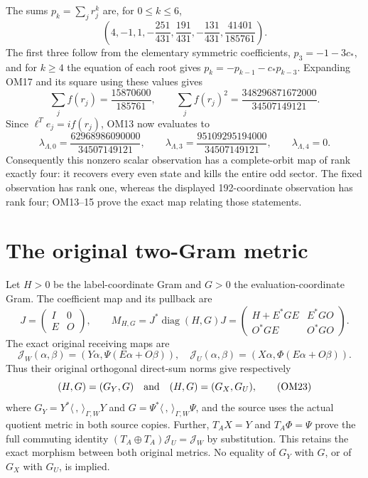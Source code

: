 \documentclass[11pt]{article}
\newcommand{\diag}{\operatorname{diag}}
\begin{document}
The sums $p_k=\sum_jr_j^k$ are, for $0\le k\le6$,
\[
\left(4,-1,1,-\frac{251}{431},\frac{191}{431},
             -\frac{131}{431},\frac{41401}{185761}\right).
\tag{OM18}
\]
The first three follow from the elementary symmetric coefficients,
$p_3=-1-3c_*$, and for $k\ge4$ the equation of each root gives
$p_k=-p_{k-1}-c_*p_{k-3}$.  Expanding OM17 and its square using
these values gives
\[
\sum_jf(r_j)=\frac{15870600}{185761},\qquad
\sum_jf(r_j)^2=\frac{348296871672000}{34507149121}.
\tag{OM19}
\]
Since $\ell^Te_j=if(r_j)$, OM13 now evaluates to
\[
\lambda_{\Lambda,0}=\frac{62968986090000}{34507149121},
\qquad
\lambda_{\Lambda,3}=\frac{95109295194000}{34507149121},
\qquad
\lambda_{\Lambda,4}=0.
\tag{OM20}
\]
Consequently this nonzero scalar observation has a complete-orbit
map of rank exactly four: it recovers every even state and kills
the entire odd sector.  The fixed observation has rank one, whereas
the displayed 192-coordinate observation has rank four; OM13--15
prove the exact map relating those statements.

\section{The original two-Gram metric}
Let $H>0$ be the label-coordinate Gram and $G>0$ the
evaluation-coordinate Gram.  The coefficient map and its pullback
are
\[
J=\begin{pmatrix}I&0\\E&O\end{pmatrix},\qquad
M_{H,G}=J^*\diag(H,G)J
=\begin{pmatrix}H+E^*GE&E^*GO\\O^*GE&O^*GO\end{pmatrix}.
\tag{OM21}
\]
The exact original receiving maps are
\[
\mathcal J_W(\alpha,\beta)
 =(Y\alpha,\Psi(E\alpha+O\beta)),\quad
\mathcal J_U(\alpha,\beta)
 =(X\alpha,\Phi(E\alpha+O\beta)).
\tag{OM22}
\]
Thus their original orthogonal direct-sum norms give respectively
\[
(H,G)=(G_Y,G)\quad\hbox{and}\quad(H,G)=(G_X,G_U),
\tag{OM23}
\]
where $G_Y=Y^*\langle\, ,\,\rangle_{\Gamma,W}Y$ and
$G=\Psi^*\langle\, ,\,\rangle_{\Gamma,W}\Psi$, and the source
uses the actual quotient metric in both source copies.  Further,
$T_AX=Y$ and $T_A\Phi=\Psi$ prove the full commuting identity
$(T_A\oplus T_A)\mathcal J_U=\mathcal J_W$ by substitution.
This retains the exact morphism between both original metrics.
No equality of $G_Y$ with $G$, or of $G_X$ with $G_U$, is implied.
\end{document}
